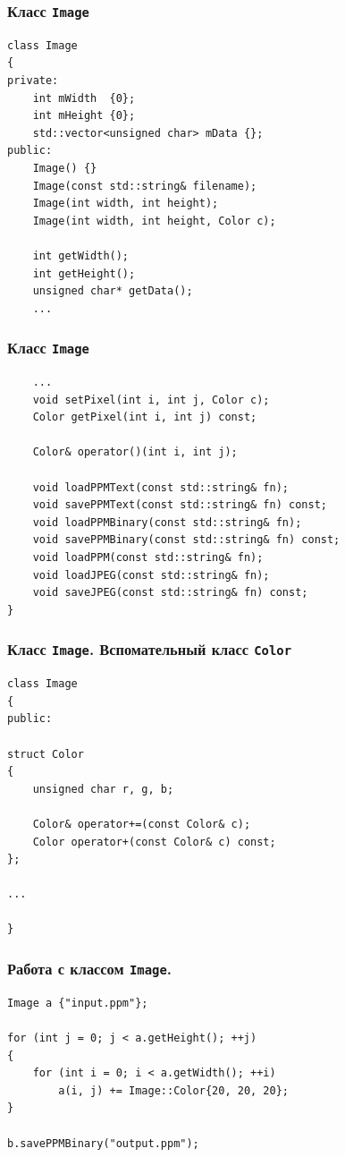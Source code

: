 \documentclass[10pt,pdf,hyperref={unicode}]{beamer}
\begin{document}
\begin{frame}[fragile]
\frametitle{Класс \texttt{Image}} 
\begin{lstlisting}
class Image
{
private:
    int mWidth  {0};
    int mHeight {0};
    std::vector<unsigned char> mData {};
public:
    Image() {}
    Image(const std::string& filename);
    Image(int width, int height);
    Image(int width, int height, Color c);

    int getWidth();
    int getHeight();
    unsigned char* getData();
    ...
\end{lstlisting}
\end{frame}

\begin{frame}[fragile]
\frametitle{Класс \texttt{Image}} 
\begin{lstlisting}
    ...
    void setPixel(int i, int j, Color c);
    Color getPixel(int i, int j) const;

    Color& operator()(int i, int j);

    void loadPPMText(const std::string& fn);
    void savePPMText(const std::string& fn) const;
    void loadPPMBinary(const std::string& fn);
    void savePPMBinary(const std::string& fn) const;
    void loadPPM(const std::string& fn);
    void loadJPEG(const std::string& fn);
    void saveJPEG(const std::string& fn) const;
}
\end{lstlisting}
\end{frame}

\begin{frame}[fragile]
\frametitle{Класс \texttt{Image}. Вспомательный класс \texttt{Color}} 
\begin{lstlisting}
class Image
{
public:

struct Color
{
    unsigned char r, g, b;

    Color& operator+=(const Color& c);
    Color operator+(const Color& c) const;
};

...

}
\end{lstlisting}
\end{frame}


\begin{frame}[fragile]
\frametitle{Работа с классом \texttt{Image}.} 
\begin{lstlisting}
Image a {"input.ppm"};

for (int j = 0; j < a.getHeight(); ++j)
{
    for (int i = 0; i < a.getWidth(); ++i)
        a(i, j) += Image::Color{20, 20, 20};
}

b.savePPMBinary("output.ppm");
\end{lstlisting}
\end{frame}
\end{document}
